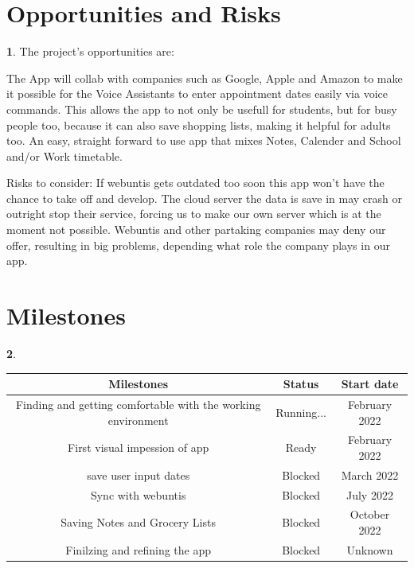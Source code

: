 \documentclass[12pt]{article}
\theoremstyle{definition}
\newtheorem{ourVersion}{ \linebreak}
\begin{document}
\pagebreak
\section{Opportunities and Risks}

 \begin{ourVersion}

The project’s opportunities are:

The App will collab with companies such as Google, Apple and Amazon to make it possible for the Voice Assistants to enter appointment dates easily via voice commands. 
This allows the app to not only be usefull for students, but for busy people too, because it can also save shopping lists, making it helpful for adults too.
An easy, straight forward to use app that mixes Notes, Calender and School and/or Work timetable.

Risks to consider: 
If webuntis gets outdated too soon this app won't have the chance to take off and develop.
The cloud server the data is save in may crash or outright stop their service, forcing us to make our own server which is at the moment not possible.
Webuntis and other partaking companies may deny our offer, resulting in big problems, depending what role the company plays in our app.
	
 \end{ourVersion}


\pagebreak

\section{Milestones}
\begin{ourVersion}
\begin{center}
\begin{tabular}{||c c c||}
 \hline
 Milestones & Status & Start date \\ [0.5ex] 
 \hline\hline
 Finding and getting comfortable with the working environment  & Running... & February 2022 \\ 
 \hline   
 First visual impession of app & Ready & February 2022 \\
 \hline
 save user input dates & Blocked & March 2022 \\
 \hline
 Sync with webuntis & Blocked & July 2022 \\
 \hline
 Saving Notes and Grocery Lists & Blocked & October 2022\\
 \hline
 Finilzing and refining the app & Blocked & Unknown \\ [1ex] 
 \hline 

\end{tabular}
\end{center}
\end{ourVersion}
\end{document}
